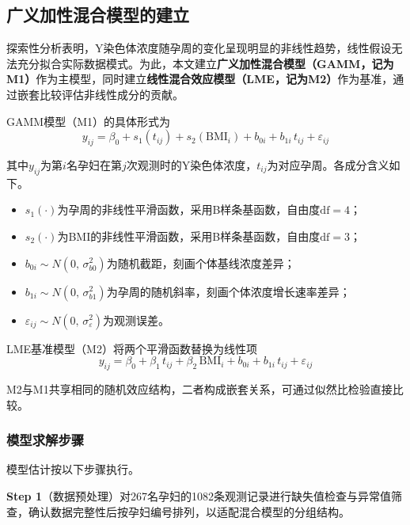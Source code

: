 \documentclass{cumcmthesis}
\begin{document}
\subsection{广义加性混合模型的建立}

探索性分析表明，Y染色体浓度随孕周的变化呈现明显的非线性趋势，线性假设无法充分拟合实际数据模式。为此，本文建立\textbf{广义加性混合模型（GAMM，记为M1）}作为主模型，同时建立\textbf{线性混合效应模型（LME，记为M2）}作为基准，通过嵌套比较评估非线性成分的贡献。

GAMM模型（M1）的具体形式为
\begin{equation}\label{eq:gamm}
  y_{ij} = \beta_0 + s_1(t_{ij}) + s_2(\mathrm{BMI}_i) + b_{0i} + b_{1i}\,t_{ij} + \varepsilon_{ij}
\end{equation}

其中$y_{ij}$为第$i$名孕妇在第$j$次观测时的Y染色体浓度，$t_{ij}$为对应孕周。各成分含义如下。

\begin{itemize}
  \item $s_1(\cdot)$为孕周的非线性平滑函数，采用B样条基函数，自由度$\mathrm{df}=4$；
  \item $s_2(\cdot)$为BMI的非线性平滑函数，采用B样条基函数，自由度$\mathrm{df}=3$；
  \item $b_{0i} \sim N(0,\,\sigma^2_{b0})$为随机截距，刻画个体基线浓度差异；
  \item $b_{1i} \sim N(0,\,\sigma^2_{b1})$为孕周的随机斜率，刻画个体浓度增长速率差异；
  \item $\varepsilon_{ij} \sim N(0,\,\sigma^2_\varepsilon)$为观测误差。
\end{itemize}

LME基准模型（M2）将两个平滑函数替换为线性项
\begin{equation}\label{eq:lme}
  y_{ij} = \beta_0 + \beta_1\,t_{ij} + \beta_2\,\mathrm{BMI}_i + b_{0i} + b_{1i}\,t_{ij} + \varepsilon_{ij}
\end{equation}

M2与M1共享相同的随机效应结构，二者构成嵌套关系，可通过似然比检验直接比较。

\subsubsection{模型求解步骤}

模型估计按以下步骤执行。

\textbf{Step 1}（数据预处理）\quad 对267名孕妇的1082条观测记录进行缺失值检查与异常值筛查，确认数据完整性后按孕妇编号排列，以适配混合模型的分组结构。
\end{document}
